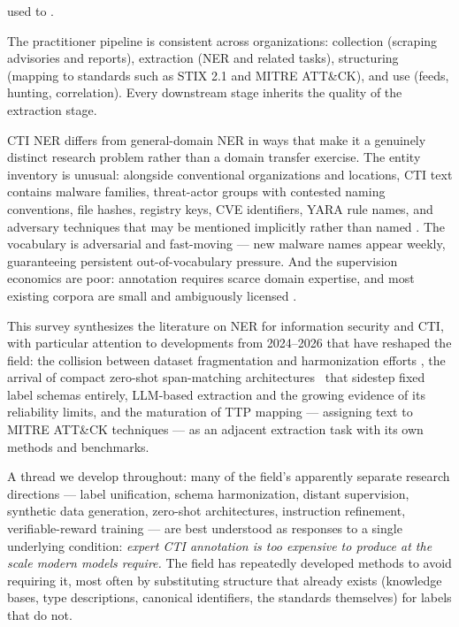 \documentclass[11pt]{article}
\begin{document}
\begin{center}
\small
\setlength{\fboxsep}{2.5pt}
 used
to .
\end{center}

The practitioner pipeline is consistent across organizations: collection (scraping advisories and reports), extraction (NER and related tasks), structuring (mapping to standards such as STIX 2.1 and MITRE ATT\&CK), and use (feeds, hunting, correlation). Every downstream stage inherits the quality of the extraction stage.

CTI NER differs from general-domain NER in ways that make it a genuinely distinct research problem rather than a domain transfer exercise. The entity inventory is unusual: alongside conventional organizations and locations, CTI text contains malware families, threat-actor groups with contested naming conventions, file hashes, registry keys, CVE identifiers, YARA rule names, and adversary techniques that may be mentioned implicitly rather than named \citep{lange2024annoctr}. The vocabulary is adversarial and fast-moving — new malware names appear weekly, guaranteeing persistent out-of-vocabulary pressure. And the supervision economics are poor: annotation requires scarce domain expertise, and most existing corpora are small and ambiguously licensed \citep{lange2024annoctr}.

This survey synthesizes the literature on NER for information security and CTI, with particular attention to developments from 2024–2026 that have reshaped the field: the collision between dataset fragmentation and harmonization efforts \citep{jalocha2025label,echchammakhy2025cyberner}, the arrival of compact zero-shot span-matching architectures~\citep{zaratiana2023gliner} that sidestep fixed label schemas entirely, LLM-based extraction and the growing evidence of its reliability limits, and the maturation of TTP mapping — assigning text to MITRE ATT\&CK techniques — as an adjacent extraction task with its own methods and benchmarks.

A thread we develop throughout: many of the field's apparently separate research directions — label unification, schema harmonization, distant supervision, synthetic data generation, zero-shot architectures, instruction refinement, verifiable-reward training — are best understood as responses to a single underlying condition: \emph{expert CTI annotation is too expensive to produce at the scale modern models require.} The field has repeatedly developed methods to avoid requiring it, most often by substituting structure that already exists (knowledge bases, type descriptions, canonical identifiers, the standards themselves) for labels that do not.
\end{document}

